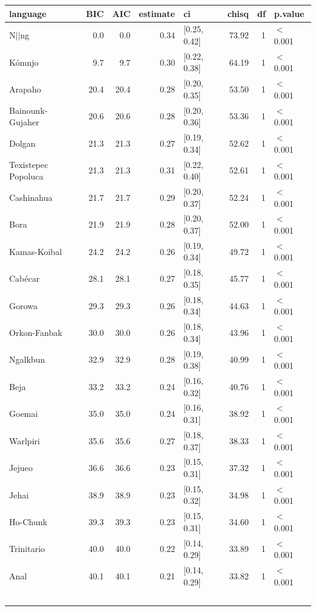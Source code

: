 \begin{table}[ht]
\centering
\begin{tabular}{lrrrlrrl}
  \hline
language & BIC & AIC & estimate & ci & chisq & df & p.value \\ 
  \hline
N$|$$|$ng & 0.0 & 0.0 & 0.34 & [0.25, 0.42] & 73.92 & 1 & $<$ 0.001 \\ 
  Kómnjo & 9.7 & 9.7 & 0.30 & [0.22, 0.38] & 64.19 & 1 & $<$ 0.001 \\ 
  Arapaho & 20.4 & 20.4 & 0.28 & [0.20, 0.35] & 53.50 & 1 & $<$ 0.001 \\ 
  Bainounk-Gujaher & 20.6 & 20.6 & 0.28 & [0.20, 0.36] & 53.36 & 1 & $<$ 0.001 \\ 
  Dolgan & 21.3 & 21.3 & 0.27 & [0.19, 0.34] & 52.62 & 1 & $<$ 0.001 \\ 
  Texistepec Popoluca & 21.3 & 21.3 & 0.31 & [0.22, 0.40] & 52.61 & 1 & $<$ 0.001 \\ 
  Cashinahua & 21.7 & 21.7 & 0.29 & [0.20, 0.37] & 52.24 & 1 & $<$ 0.001 \\ 
  Bora & 21.9 & 21.9 & 0.28 & [0.20, 0.37] & 52.00 & 1 & $<$ 0.001 \\ 
  Kamas-Koibal & 24.2 & 24.2 & 0.26 & [0.19, 0.34] & 49.72 & 1 & $<$ 0.001 \\ 
  Cabécar & 28.1 & 28.1 & 0.27 & [0.18, 0.35] & 45.77 & 1 & $<$ 0.001 \\ 
  Gorowa & 29.3 & 29.3 & 0.26 & [0.18, 0.34] & 44.63 & 1 & $<$ 0.001 \\ 
  Orkon-Fanbak & 30.0 & 30.0 & 0.26 & [0.18, 0.34] & 43.96 & 1 & $<$ 0.001 \\ 
  Ngalkbun & 32.9 & 32.9 & 0.28 & [0.19, 0.38] & 40.99 & 1 & $<$ 0.001 \\ 
  Beja & 33.2 & 33.2 & 0.24 & [0.16, 0.32] & 40.76 & 1 & $<$ 0.001 \\ 
  Goemai & 35.0 & 35.0 & 0.24 & [0.16, 0.31] & 38.92 & 1 & $<$ 0.001 \\ 
  Warlpiri & 35.6 & 35.6 & 0.27 & [0.18, 0.37] & 38.33 & 1 & $<$ 0.001 \\ 
  Jejueo & 36.6 & 36.6 & 0.23 & [0.15, 0.31] & 37.32 & 1 & $<$ 0.001 \\ 
  Jehai & 38.9 & 38.9 & 0.23 & [0.15, 0.32] & 34.98 & 1 & $<$ 0.001 \\ 
  Ho-Chunk & 39.3 & 39.3 & 0.23 & [0.15, 0.31] & 34.60 & 1 & $<$ 0.001 \\ 
  Trinitario & 40.0 & 40.0 & 0.22 & [0.14, 0.29] & 33.89 & 1 & $<$ 0.001 \\ 
  Anal & 40.1 & 40.1 & 0.21 & [0.14, 0.29] & 33.82 & 1 & $<$ 0.001 \\ 
$$
\end{tabular}
\end{table}
